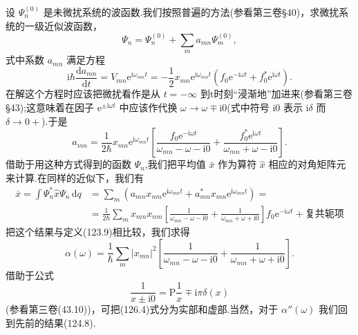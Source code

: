 设 $\Psi_n^{(0)}$ 是未微扰系统的波函数.我们按照普遍的方法(参看第三卷§40)，求微扰系统的一级近似波函数，
\begin{equation}
  \Psi_n=\Psi_n^{(0)}+\sum_ma_{mn}\Psi_m^{(0)},
\end{equation}
式中系数 $a_{mn}$ 满足方程
\begin{equation*}
  \mathrm{i}\hbar\frac{\mathrm{d}a_{mn}}{\mathrm{d}t}
  =V_{mn}\mathrm{e}^{\mathrm{i}\omega_{mn}t}
  =-\frac{1}{2}x_{mn}\mathrm{e}^{\mathrm{i}\omega_{mn}t}
  \left(f_0\mathrm{e}^{-\mathrm{i}\omega t}+f_0^*\mathrm{e}^{\mathrm{i}\omega t}\right).
\end{equation*}
在解这个方程时应该把微扰看作是从 $t=-\infty$ 到t时刻“浸渐地”加进来(参看第三卷§43);这意味着在因子 $\mathrm{e}^{\pm\mathrm{i}\omega t}$ 中应该作代换 $\omega\to\omega\mp\mathrm{i}0$(式中符号 i0 表示 $\mathrm{i}\delta$ 而 $\delta\to 0+$).于是
\begin{equation}
  a_{mn}=\frac{1}{2\hbar}x_{mn}\mathrm{e}^{\mathrm{i}\omega_{mn}t}
  \left[\frac{f_0\mathrm{e}^{-\mathrm{i}\omega t}}{\omega_{mn}-\omega-\mathrm{i}0}
  +\frac{f_0^*\mathrm{e}^{\mathrm{i}\omega t}}{\omega_{mn}+\omega-\mathrm{i}0}\right].
\end{equation}
借助于用这种方式得到的函数 $\Psi_n$,我们把平均值 $\bar{x}$ 作为算符 $\hat{x}$ 相应的对角矩阵元来计算.在同样的近似下，我们有
\begin{equation*}
\begin{aligned}
  \bar{x}=\int\Psi_n^*\hat{x}\Psi_n\,\mathrm{d}q
  &=\sum_m\left(a_{mn}x_{nm}\mathrm{e}^{\mathrm{i}\omega_{mn}t}
  +a_{mn}^*x_{mn}\mathrm{e}^{\mathrm{i}\omega_{mn}t}\right)=\\
  &=\frac{1}{2\hbar}\sum_m x_{mn}x_{nm}
  \left[\frac{1}{\omega_{mn}-\omega-\mathrm{i}0}
  +\frac{1}{\omega_{mn}+\omega+\mathrm{i}0}\right]
  f_0\mathrm{e}^{-\mathrm{i}\omega t}+\text{复共轭项}
\end{aligned}
\end{equation*}
把这个结果与定义(123.9)相比较，我们求得
\begin{equation}
  \alpha(\omega)=\frac{1}{\hbar}\sum_m|x_{mn}|^2
  \left[\frac{1}{\omega_{mn}-\omega-\mathrm{i}0}
  +\frac{1}{\omega_{mn}+\omega+\mathrm{i}0}\right].
\end{equation}
借助于公式
\begin{equation}
  \frac{1}{x\pm\mathrm{i}0}=\mathrm{P}\frac{1}{x}\mp\mathrm{i}\pi\delta(x)
\end{equation}
(参看第三卷(43.10))，可把(126.4)式分为实部和虚部.当然，对于 $\alpha''(\omega)$ 我们回到先前的结果(124.8).

